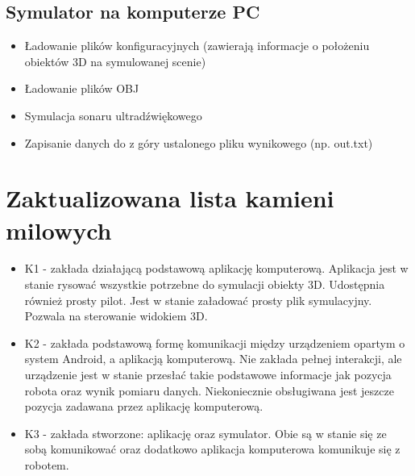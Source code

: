 \documentclass[a4paper,12pt]{article}
\begin{document}
\subsection{Symulator na komputerze PC}
\begin{itemize}
\item Ładowanie plików konfiguracyjnych (zawierają informacje o położeniu obiektów 3D na symulowanej scenie)
\item Ładowanie plików OBJ
\item Symulacja sonaru ultradźwiękowego
\item Zapisanie danych do z góry ustalonego pliku wynikowego (np. out.txt)
\end{itemize}

\section{Zaktualizowana lista kamieni milowych}
\begin{itemize}
\item K1 - zakłada działającą podstawową aplikację komputerową. Aplikacja jest w stanie rysować wszystkie potrzebne do symulacji obiekty 3D. Udostępnia również prosty pilot.
Jest w stanie załadować prosty plik symulacyjny. Pozwala na sterowanie widokiem 3D.
\item K2 - zakłada podstawową formę komunikacji między urządzeniem opartym o system Android, a aplikacją komputerową. Nie zakłada pełnej interakcji, ale urządzenie jest w stanie przesłać takie podstawowe informacje jak pozycja robota oraz wynik pomiaru danych. Niekoniecznie obsługiwana jest jeszcze pozycja zadawana przez aplikację komputerową.
\item K3 - zakłada stworzone: aplikację oraz symulator. Obie są w stanie się ze sobą komunikować oraz dodatkowo aplikacja komputerowa komunikuje się z robotem.
\end{itemize}
\end{document}
